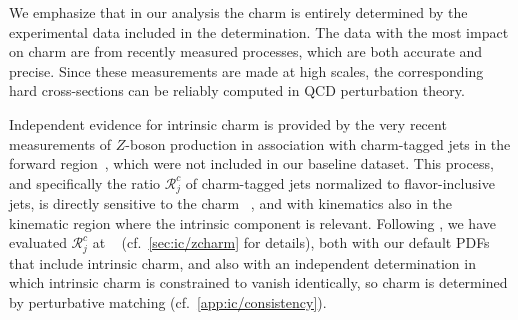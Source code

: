 We emphasize that in our analysis the charm \pdf is entirely
determined by the experimental data included in the \pdf determination.
The data with the most impact on charm are from recently measured \lhc
processes, which are both accurate and precise.
%
Since these measurements are made at high scales, the corresponding
hard cross-sections can be reliably computed in QCD perturbation theory.

Independent evidence for intrinsic charm
is provided by the very recent \lhcb measurements of $Z$-boson production
in association with charm-tagged jets in the forward
region~\cite{LHCb:2021stx}, which were not included in our baseline dataset.
%
This process, and specifically the ratio $\mathcal{R}_j^c$
of charm-tagged jets normalized to flavor-inclusive jets,
is directly sensitive to the charm \pdf~\cite{Boettcher:2015sqn}, and
with \lhcb kinematics also
in the kinematic region  where the  intrinsic component is relevant.
%
Following \cite{Boettcher:2015sqn,LHCb:2021stx}, we have  evaluated
$\mathcal{R}_j^c$ at \nlo~\cite{Alioli:2010xd,Sjostrand:2007gs} (cf.\
\cref{sec:ic/zcharm} for details), both with our default PDFs that include
intrinsic charm, and also with an independent \pdf determination in which
intrinsic charm is constrained to vanish  identically, so charm is determined
by perturbative matching (cf.\ \cref{app:ic/consistency}).

